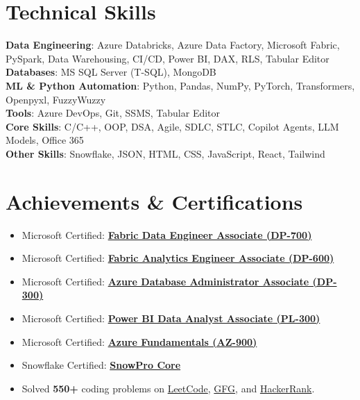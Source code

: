 \documentclass[letterpaper,11pt]{article}
\begin{document}
\section{Technical Skills}
 \begin{itemize}[leftmargin=0.15in, label={}]
    \small{\item{
     \textbf{Data Engineering}{: Azure Databricks, Azure Data Factory, Microsoft Fabric, PySpark, Data Warehousing, CI/CD, Power BI, DAX, RLS, Tabular Editor} \\
     \textbf{Databases}{: MS SQL Server (T-SQL), MongoDB} \\
     \textbf{ML \& Python Automation}{: Python, Pandas, NumPy, PyTorch, Transformers, Openpyxl, FuzzyWuzzy} \\
     \textbf{Tools}{: Azure DevOps, Git, SSMS, Tabular Editor} \\
     \textbf{Core Skills}{: C/C++, OOP, DSA, Agile, SDLC, STLC, Copilot Agents, LLM Models, Office 365} \\
     \textbf{Other Skills}{: Snowflake, JSON, HTML, CSS, JavaScript, React, Tailwind}
    }}
 \end{itemize}

\section{Achievements \& Certifications}
\begin{itemize}[leftmargin=*, noitemsep]
  \item Microsoft Certified: \href{https://learn.microsoft.com/en-us/users/pandeyharsh407/credentials/1a74a8b2bef774fb}{\textbf{Fabric Data Engineer Associate (DP-700)}}
  \item Microsoft Certified: \href{https://learn.microsoft.com/api/credentials/share/en-us/pandeyharsh407/60E65BB0D61CBC83}{\textbf{Fabric Analytics Engineer Associate (DP-600)}}
  \item Microsoft Certified: \href{https://learn.microsoft.com/en-us/users/harshpandey-8148/credentials/bff37d5af033ebe9}{\textbf{Azure Database Administrator Associate (DP-300)}}
  \item Microsoft Certified: \href{https://learn.microsoft.com/en-us/users/harshpandey-1754/credentials/41f7569c929fc296}{\textbf{Power BI Data Analyst Associate (PL-300)}}
  \item Microsoft Certified: \href{https://learn.microsoft.com/api/credentials/share/en-us/pandeyharsh407/76878ABA437AB7C8}{\textbf{Azure Fundamentals (AZ-900)}}
  \item Snowflake Certified: \href{https://achieve.snowflake.com/6e5d143a-8f99-4d5c-8cc8-df83a4445c00}{\textbf{SnowPro Core}}
  \item Solved \textbf{550+} coding problems on
    \href{https://leetcode.com/pandeyharsh407}{LeetCode},
    \href{https://www.geeksforgeeks.org/user/pandeyharsh407}{GFG}, and
    \href{https://www.hackerrank.com/profile/pandeyharsh407}{HackerRank}.
\end{itemize}
\end{document}
